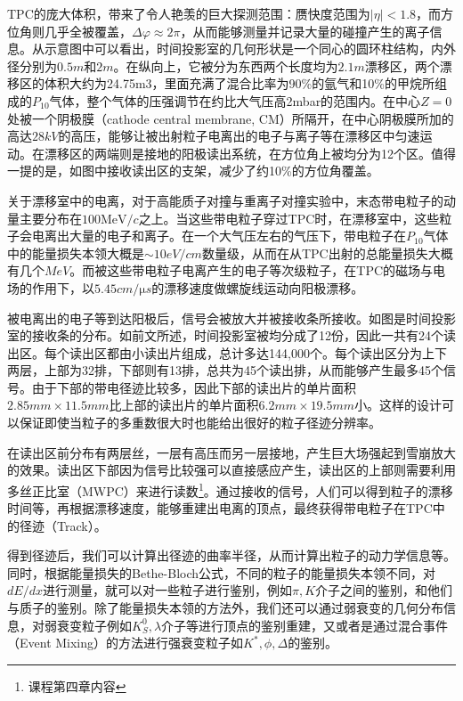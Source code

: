 \documentclass[%
 reprint,
 amsmath,amssymb,
 aps,
]{revtex4-1}
\begin{document}
TPC的庞大体积，带来了令人艳羡的巨大探测范围：赝快度范围为$|\eta|<1.8$，而方位角则几乎全被覆盖，$\Delta\varphi \approx 2\pi$，从而能够测量并记录大量的碰撞产生的离子信息。从示意图中可以看出，时间投影室的几何形状是一个同心的圆环柱结构，内外径分别为$0.5\si{m}$和$2\si{m}$。在纵向上，它被分为东西两个长度均为$2.1\si{m}$漂移区，两个漂移区的体积大约为24.75m3，里面充满了混合比率为90\%的氩气和10\%的甲烷所组成的$P_{10}$气体，整个气体的压强调节在约比大气压高2mbar的范围内。在中心$Z=0$处被一个阴极膜（cathode central membrane, CM）所隔开，在中心阴极膜所加的高达$28\si{kV}$的高压，能够让被出射粒子电离出的电子与离子等在漂移区中匀速运动。在漂移区的两端则是接地的阳极读出系统，在方位角上被均分为12个区。值得一提的是，如图中接收读出区的支架，减少了约10\%的方位角覆盖。

关于漂移室中的电离，对于高能质子对撞与重离子对撞实验中，末态带电粒子的动量主要分布在$100\si{\MeV/c}$之上。当这些带电粒子穿过TPC时，在漂移室中，这些粒子会电离出大量的电子和离子。在一个大气压左右的气压下，带电粒子在$P_{10}$气体中的能量损失本领大概是$\sim10\si{eV/cm}$数量级，从而在从TPC出射的总能量损失大概有几个$\si{MeV}$。而被这些带电粒子电离产生的电子等次级粒子，在TPC的磁场与电场的作用下，以$5.45\si{cm/\micro s}$的漂移速度做螺旋线运动向阳极漂移。

被电离出的电子等到达阳极后，信号会被放大并被接收条所接收。如图是时间投影室的接收条的分布。如前文所述，时间投影室被均分成了12份，因此一共有24个读出区。每个读出区都由小读出片组成，总计多达144,000个。每个读出区分为上下两层，上部为32排，下部则有13排，总共为45个读出排，从而能够产生最多45个信号。由于下部的带电径迹比较多，因此下部的读出片的单片面积$2.85\si{mm}\times11.5\si{mm}$比上部的读出片的单片面积$6.2\si{mm}\times19.5\si{mm}$小。这样的设计可以保证即使当粒子的多重数很大时也能给出很好的粒子径迹分辨率。

在读出区前分布有两层丝，一层有高压而另一层接地，产生巨大场强起到雪崩放大的效果。读出区下部因为信号比较强可以直接感应产生，读出区的上部则需要利用多丝正比室（MWPC）来进行读数\footnote{课程第四章内容}。通过接收的信号，人们可以得到粒子的漂移时间等，再根据漂移速度，能够重建出电离的顶点，最终获得带电粒子在TPC中的径迹（Track）。

得到径迹后，我们可以计算出径迹的曲率半径，从而计算出粒子的动力学信息等。同时，根据能量损失的Bethe-Bloch公式，不同的粒子的能量损失本领不同，对$dE/dx$进行测量，就可以对一些粒子进行鉴别，例如$\pi,K$介子之间的鉴别，和他们与质子的鉴别。除了能量损失本领的方法外，我们还可以通过弱衰变的几何分布信息，对弱衰变粒子例如$K_S^0,\lambda$介子等进行顶点的鉴别重建，又或者是通过混合事件（Event Mixing）的方法进行强衰变粒子如$K^*,\phi,\Delta$的鉴别。
\end{document}
